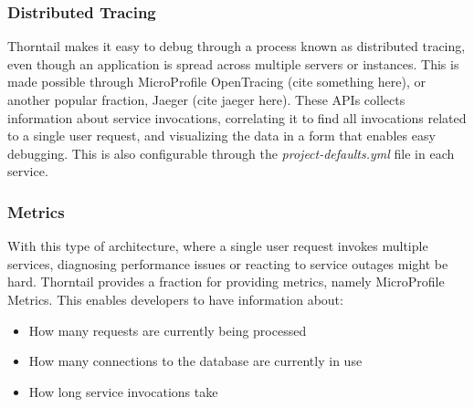 \subsubsection{Distributed Tracing}
Thorntail makes it easy to debug through a process known as distributed tracing, even though an application is spread across multiple servers or instances. This is made possible through MicroProfile OpenTracing (cite something here), or another popular fraction, Jaeger (cite jaeger here). These APIs collects information about service invocations, correlating it to find all invocations related to a single user request, and visualizing the data in a form that enables easy debugging. This is also configurable through the \textit{project-defaults.yml} file in each service. \cite{ThorntailTracing}

\subsubsection{Metrics}
With this type of architecture, where a single user request invokes multiple services, diagnosing performance issues or reacting to service outages might be hard. Thorntail provides a fraction for providing metrics, namely MicroProfile Metrics. \cite{ThorntailMetrics} This enables developers to have information about:

\begin{itemize}
    \item How many requests are currently being processed
    \item How many connections to the database are currently in use
    \item How long service invocations take
\end{itemize}


